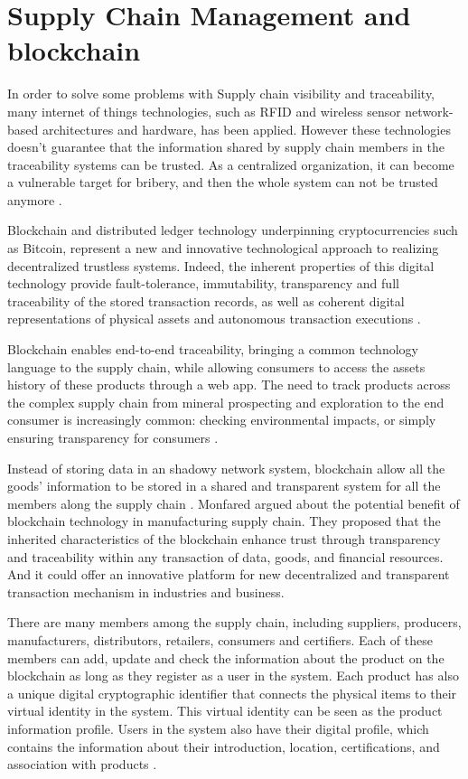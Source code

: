 \section{Supply Chain Management and blockchain}\label{sec:scmBlock}

In order to solve some problems with Supply chain visibility and traceability, many internet of things technologies, such as RFID and wireless sensor network-based architectures and hardware, has been applied. However these technologies doesn't guarantee that the information shared by supply chain members in the traceability systems can be trusted. As a centralized organization, it can become a vulnerable target for bribery, and then the whole system can not be trusted anymore \cite{tian2017supply}.

Blockchain and distributed ledger technology underpinning cryptocurrencies such as Bitcoin, represent a new and innovative technological approach to realizing decentralized trustless systems. Indeed, the inherent properties of this digital technology provide fault-tolerance, immutability, transparency and full traceability of the stored transaction records, as well as coherent digital representations of physical assets and autonomous transaction executions \cite{caro2018blockchain}.

Blockchain enables end-to-end traceability, bringing a common technology language to the supply chain, while allowing consumers to access the assets history of these products through a web app. The need to track products across the complex supply chain from mineral prospecting and exploration to the end consumer is increasingly common: checking environmental impacts, or simply ensuring transparency for consumers \cite{galvez2018future}.


Instead of storing data in an shadowy network system, blockchain allow all the goods' information to be stored in a shared and transparent system for all the members along the supply chain \cite{tian2017supply}. Monfared \cite{abeyratne2016blockchain} argued about the potential benefit of blockchain technology in manufacturing supply chain. They proposed that the inherited characteristics of the blockchain enhance trust through transparency and traceability within any transaction of data, goods, and financial resources. And it could offer an innovative platform for new decentralized and transparent transaction mechanism in industries and business.

There are many members among the supply chain, including suppliers, producers, manufacturers, distributors, retailers, consumers and certifiers. Each of these members can add, update and check the information about the product on the blockchain as long as they register as a user in the system. Each product has also a unique digital cryptographic identifier that connects the physical items to their virtual identity in the system. This virtual identity can be seen as the product information profile. Users in the system also have their digital profile, which contains the information about their introduction, location, certifications, and association with products \cite{tian2017supply}.

